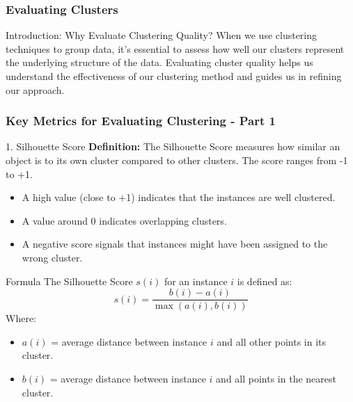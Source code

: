 \documentclass[aspectratio=169]{beamer}
\begin{document}
\begin{frame}[fragile]
    \frametitle{Evaluating Clusters}
    \begin{block}{Introduction: Why Evaluate Clustering Quality?}
        When we use clustering techniques to group data, it's essential to assess how well our clusters represent the underlying structure of the data. Evaluating cluster quality helps us understand the effectiveness of our clustering method and guides us in refining our approach.
    \end{block}
\end{frame}

\begin{frame}[fragile]
    \frametitle{Key Metrics for Evaluating Clustering - Part 1}
    \begin{block}{1. Silhouette Score}
        \textbf{Definition:} The Silhouette Score measures how similar an object is to its own cluster compared to other clusters. The score ranges from -1 to +1.
        \begin{itemize}
            \item A high value (close to +1) indicates that the instances are well clustered.
            \item A value around 0 indicates overlapping clusters.
            \item A negative score signals that instances might have been assigned to the wrong cluster.
        \end{itemize}
    \end{block}
    
    \begin{block}{Formula}
        The Silhouette Score \( s(i) \) for an instance \( i \) is defined as:
        \begin{equation}
            s(i) = \frac{b(i) - a(i)}{\max(a(i), b(i))}
        \end{equation}
        Where:
        \begin{itemize}
            \item \( a(i) \) = average distance between instance \( i \) and all other points in its cluster.
            \item \( b(i) \) = average distance between instance \( i \) and all points in the nearest cluster.
        \end{itemize}
    \end{block}
\end{frame}
\end{document}
